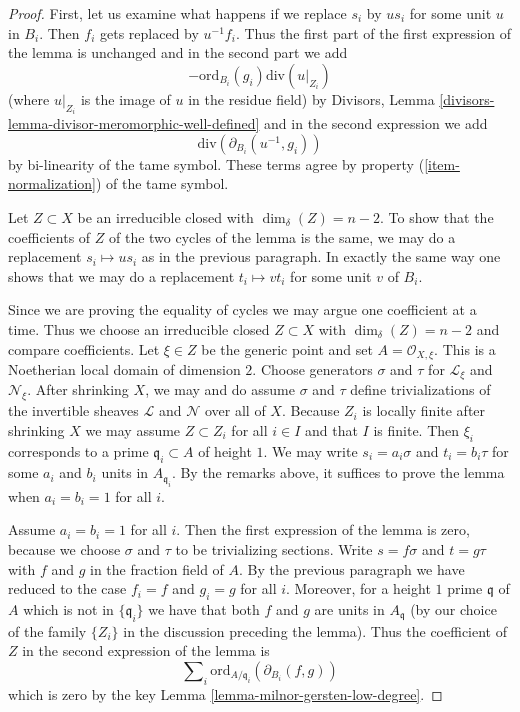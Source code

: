 \documentclass[10pt,a4paper]{amsart}
\theoremstyle{plain}
\theoremstyle{definition}
\theoremstyle{remark}
\numberwithin{equation}{subsection}
\begin{document}
\begin{proof}
First, let us examine what happens if we replace $s_i$ by $us_i$
for some unit $u$ in $B_i$. Then $f_i$ gets replaced by $u^{-1} f_i$.
Thus the first part of the first expression of the lemma is unchanged
and in the second part we add
$$
-\text{ord}_{B_i}(g_i)\text{div}(u|_{Z_i})
$$
(where $u|_{Z_i}$ is the image of $u$ in the residue field) by
Divisors, Lemma \ref{divisors-lemma-divisor-meromorphic-well-defined}
and in the second expression we add
$$
\text{div}(\partial_{B_i}(u^{-1}, g_i))
$$
by bi-linearity of the tame symbol. These terms agree by property
(\ref{item-normalization}) of the tame symbol.

\medskip\noindent
Let $Z \subset X$ be an irreducible closed with $\dim_\delta(Z) = n - 2$.
To show that the coefficients of $Z$ of the two cycles of the lemma
is the same, we may do a replacement $s_i \mapsto us_i$ as in the previous
paragraph. In exactly the same way one shows that we may do a replacement
$t_i \mapsto vt_i$ for some unit $v$ of $B_i$.

\medskip\noindent
Since we are proving the equality of cycles we may argue one coefficient
at a time. Thus we choose an irreducible closed $Z \subset X$
with $\dim_\delta(Z) = n - 2$ and compare coefficients. Let $\xi \in Z$
be the generic point and set $A = \mathcal{O}_{X, \xi}$. This is a Noetherian
local domain of dimension $2$. Choose generators $\sigma$ and $\tau$
for $\mathcal{L}_\xi$ and $\mathcal{N}_\xi$. After shrinking $X$, we may
and do assume $\sigma$ and $\tau$ define trivializations
of the invertible sheaves $\mathcal{L}$ and $\mathcal{N}$ over all of $X$.
Because $Z_i$ is locally
finite after shrinking $X$ we may assume $Z \subset Z_i$ for all $i \in I$
and that $I$ is finite. Then $\xi_i$ corresponds to a prime
$\mathfrak q_i \subset A$ of height $1$.
We may write $s_i = a_i \sigma$ and $t_i = b_i \tau$
for some $a_i$ and $b_i$ units in $A_{\mathfrak q_i}$.
By the remarks above, it suffices to prove the lemma when
$a_i = b_i = 1$ for all $i$.

\medskip\noindent
Assume $a_i = b_i = 1$ for all $i$. Then the first expression of the
lemma is zero, because we choose $\sigma$ and $\tau$ to be trivializing
sections. Write $s = f\sigma$ and $t = g \tau$ with $f$ and $g$ in the
fraction field of $A$. By the previous paragraph we have reduced to the case
$f_i = f$ and $g_i = g$ for all $i$. Moreover, for a height $1$ prime
$\mathfrak q$ of $A$ which is not in $\{\mathfrak q_i\}$ we have
that both $f$ and $g$ are units in $A_\mathfrak q$ (by our choice of
the family $\{Z_i\}$ in the discussion preceding the lemma). Thus
the coefficient of $Z$ in the second expression of the lemma is
$$
\sum\nolimits_i \text{ord}_{A/\mathfrak q_i}(\partial_{B_i}(f, g))
$$
which is zero by the key Lemma \ref{lemma-milnor-gersten-low-degree}.
\end{proof}
\end{document}
